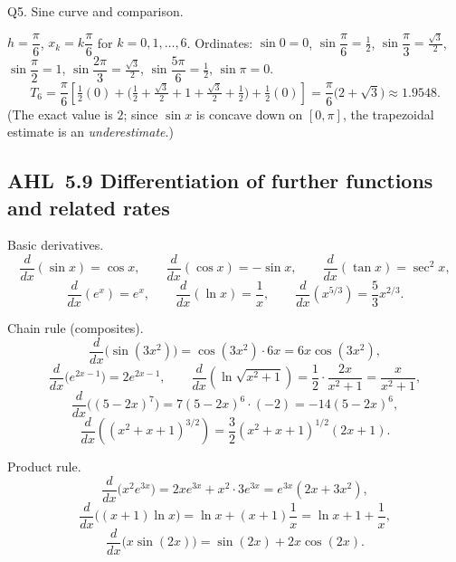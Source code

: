 \documentclass[11pt]{article}
\def\textbf#1{#1}%
\newcommand{\tocsubsection}[1]{\subsection{#1}}
\begin{document}
\begin{solution}
\textbf{Q5. Sine curve and comparison.}

\(h=\dfrac{\pi}{6}\), \(x_k=k\dfrac{\pi}{6}\) for \(k=0,1,\ldots,6\).
Ordinates: \(\sin 0=0\), \(\sin\dfrac{\pi}{6}=\tfrac12\), \(\sin\dfrac{\pi}{3}=\tfrac{\sqrt3}{2}\),
\(\sin\dfrac{\pi}{2}=1\), \(\sin\dfrac{2\pi}{3}=\tfrac{\sqrt3}{2}\), \(\sin\dfrac{5\pi}{6}=\tfrac12\), \(\sin\pi=0\).
\[
T_6
= \frac{\pi}{6}\!\left[\tfrac12(0)+\Big(\tfrac12+\tfrac{\sqrt3}{2}+1+\tfrac{\sqrt3}{2}+\tfrac12\Big)+\tfrac12(0)\right]
= \frac{\pi}{6}\Big(2+\sqrt3\Big)
\approx \boxed{1.9548}.
\]
(The exact value is \(2\); since \(\sin x\) is concave down on \([0,\pi]\), the trapezoidal estimate is an \emph{underestimate}.)
\end{solution}


\tocsubsection{AHL 5.9 \; Differentiation of further functions and related rates}





\begin{solution}
\textbf{Basic derivatives.}
\[
\frac{d}{dx}(\sin x)=\cos x,\qquad
\frac{d}{dx}(\cos x)=-\sin x,\qquad
\frac{d}{dx}(\tan x)=\sec^{2}x,
\]
\[
\frac{d}{dx}(e^{x})=e^{x},\qquad
\frac{d}{dx}(\ln x)=\frac{1}{x},\qquad
\frac{d}{dx}\!\left(x^{5/3}\right)=\frac{5}{3}x^{2/3}.
\]
\end{solution}

\begin{solution}
\textbf{Chain rule (composites).}
\[
\frac{d}{dx}\big(\sin(3x^{2})\big)=\cos(3x^{2})\cdot 6x=6x\cos(3x^{2}),
\]
\[
\frac{d}{dx}\big(e^{2x-1}\big)=2e^{2x-1},
\qquad
\frac{d}{dx}\!\left(\ln\!\sqrt{x^{2}+1}\right)=\frac{1}{2}\cdot\frac{2x}{x^{2}+1}=\frac{x}{x^{2}+1},
\]
\[
\frac{d}{dx}\big((5-2x)^{7}\big)=7(5-2x)^{6}\cdot(-2)=-14(5-2x)^{6},
\]
\[
\frac{d}{dx}\!\left((x^{2}+x+1)^{3/2}\right)=\frac{3}{2}(x^{2}+x+1)^{1/2}(2x+1).
\]
\end{solution}

\begin{solution}
\textbf{Product rule.}
\[
\frac{d}{dx}\big(x^{2}e^{3x}\big)=2xe^{3x}+x^{2}\cdot 3e^{3x}=e^{3x}(2x+3x^{2}),
\]
\[
\frac{d}{dx}\big((x+1)\ln x\big)=\ln x+(x+1)\frac{1}{x}=\ln x+1+\frac{1}{x},
\]
\[
\frac{d}{dx}\big(x\sin(2x)\big)=\sin(2x)+2x\cos(2x).
\]
\end{solution}
\end{document}
